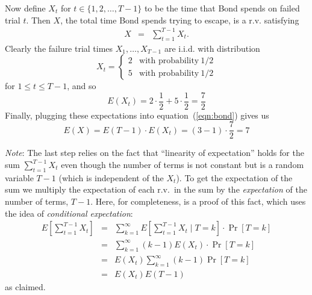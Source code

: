 \documentclass[]{article}
\begin{document}
\begin{qunlist}
{{Now define $X_t$ for $t\in\{1,2,\ldots,T-1\}$ to be the time that Bond spends on failed trial $t$.  Then $X$, the total time Bond spends trying to escape, is a r.v. satisfying
\begin{eqnarray} \label{eqn:bond}
X &=& \sum_{t=1}^{T-1} X_t.
\end{eqnarray}
Clearly the failure trial times $X_1,\ldots,X_{T-1}$ are i.i.d. with distribution
\begin{equation*}
X_t = \begin{cases}
    2 & \mbox{with probability}\ 1/2 \\
    5 & \mbox{with probability}\ 1/2
    \end{cases}
\end{equation*}
for $1\le t\le T-1$, and so
\begin{equation*}
E(X_t) =  2\cdot \frac{1}{2} + 5\cdot\frac{1}{2} = \frac{7}{2}
\end{equation*}
Finally, plugging these expectations into equation~(\ref{eqn:bond}) gives us
\begin{equation*}
E(X) = E(T-1)\cdot E(X_t) = (3-1)\cdot\frac{7}{2} = 7
\end{equation*}

{\it Note}: The last step relies on the fact that ``linearity of expectation'' holds for the sum $\sum_{t=1}^{T-1} X_t$ even though the number of terms is not constant but is a random variable $T-1$ (which is independent of the $X_t$).  To get the expectation of the sum we multiply the expectation of each r.v.\ in the sum by the {\it expectation\/} of the number of terms, $T-1$.  Here, for completeness, is a proof of this fact, which uses the idea of {\it conditional expectation}:
\begin{eqnarray*}
E \left[\sum_{t=1}^{T-1} X_t \right] 
&=& \sum_{k=1}^\infty E \left[\sum_{t=1}^{T-1} X_t \mid T = k \right] \cdot\Pr[T=k]\\
&=& \sum_{k=1}^\infty (k-1)E(X_t) \cdot\Pr[T=k]\\
&=& E(X_t) \sum_{k=1}^\infty (k-1)\Pr[T=k] \\
&=& E(X_t) E(T-1)
\end{eqnarray*}
as claimed.

}}


\end{qunlist}
\end{document}
